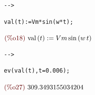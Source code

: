 \documentclass{article}
\begin{document}
\noindent
\begin{minipage}[t]{8ex}{\color{red}\bf
\begin{verbatim}
-->  
\end{verbatim}}
\end{minipage}
\begin{minipage}[t]{\textwidth}{\color{blue}
\begin{verbatim}
val(t):=Vm*sin(w*t);
\end{verbatim}}
\end{minipage}
\begin{math}\displaystyle
\parbox{8ex}{\color{labelcolor}(\%o18) }
\mathrm{val}\left( t\right) :=Vm\,\mathrm{sin}\left( w\,t\right) 
\end{math}


\noindent
\begin{minipage}[t]{8ex}{\color{red}\bf
\begin{verbatim}
-->  
\end{verbatim}}
\end{minipage}
\begin{minipage}[t]{\textwidth}{\color{blue}
\begin{verbatim}
ev(val(t),t=0.006);
\end{verbatim}}
\end{minipage}
\begin{math}\displaystyle
\parbox{8ex}{\color{labelcolor}(\%o27) }
309.3493155034204
\end{math}
\end{document}
